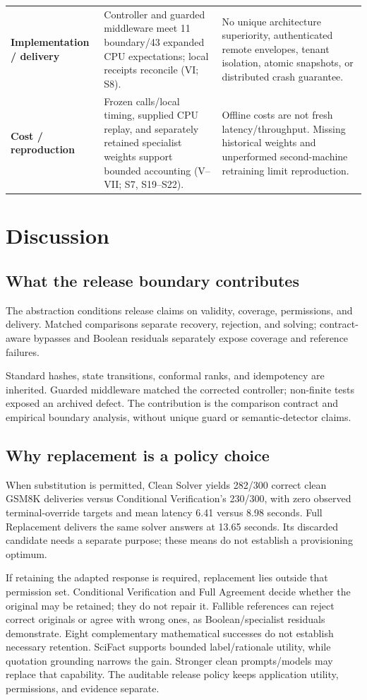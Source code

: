 \documentclass[journal]{IEEEtran}
\begin{document}
\begin{table}[t]
\begin{tabular}{@{}L{2.75cm}L{7.0cm}L{7.0cm}@{}}
\addlinespace[3pt]
\textbf{Implementation / delivery} & Controller and guarded middleware meet 11 boundary/43 expanded CPU expectations; local receipts reconcile (VI; S8). & No unique architecture superiority, authenticated remote envelopes, tenant isolation, atomic snapshots, or distributed crash guarantee.\\
\addlinespace[3pt]
\textbf{Cost / reproduction} & Frozen calls/local timing, supplied CPU replay, and separately retained specialist weights support bounded accounting (V--VII; S7, S19--S22). & Offline costs are not fresh latency/throughput. Missing historical weights and unperformed second-machine retraining limit reproduction.\\
\bottomrule
\end{tabular}
\end{table}

\section{Discussion}
\subsection{What the release boundary contributes}
The abstraction conditions release claims on validity, coverage, permissions, and delivery. Matched comparisons separate recovery, rejection, and solving; contract-aware bypasses and Boolean residuals separately expose coverage and reference failures.

Standard hashes, state transitions, conformal ranks, and idempotency are inherited. Guarded middleware matched the corrected controller; non-finite tests exposed an archived defect. The contribution is the comparison contract and empirical boundary analysis, without unique guard or semantic-detector claims.

\subsection{Why replacement is a policy choice}
When substitution is permitted, Clean Solver yields 282/300 correct clean GSM8K deliveries versus Conditional Verification's 230/300, with zero observed terminal-override targets and mean latency 6.41 versus 8.98 seconds. Full Replacement delivers the same solver answers at 13.65 seconds. Its discarded candidate needs a separate purpose; these means do not establish a provisioning optimum.

If retaining the adapted response is required, replacement lies outside that permission set. Conditional Verification and Full Agreement decide whether the original may be retained; they do not repair it. Fallible references can reject correct originals or agree with wrong ones, as Boolean/specialist residuals demonstrate. Eight complementary mathematical successes do not establish necessary retention. SciFact supports bounded label/rationale utility, while quotation grounding narrows the gain. Stronger clean prompts/models may replace that capability. The auditable release policy keeps application utility, permissions, and evidence separate.
\end{document}
